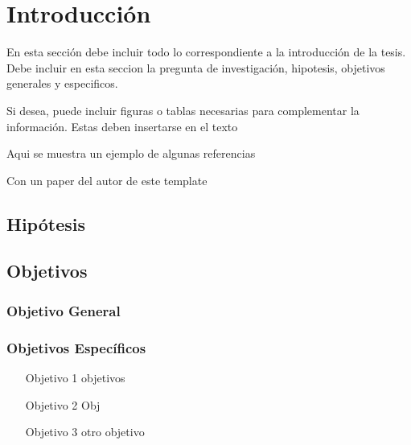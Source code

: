 \chapter{Introducción}
En esta sección debe incluir todo lo correspondiente a la introducción de la tesis. 
Debe incluir en esta seccion la pregunta de investigación, hipotesis, objetivos generales y especificos.

Si desea, puede incluir figuras o tablas necesarias para complementar la información.
Estas deben insertarse en el texto

Aqui se muestra un ejemplo de algunas referencias
\cite{godoyNamedEntityRecognition2023, torresPredictingCardiovascularRehabilitation2023}

Con un paper del autor de este template \citeauthor{melladoDeepLearningClassifier2023}

\section{Hipótesis}

\section{Objetivos}
\subsection{Objetivo General}

\subsection{Objetivos Específicos}
\begin{itemize}
    \item[Objetivo 1] objetivos
    \item[Objetivo 2] Obj
    \item[Objetivo 3] otro objetivo  
\end{itemize}